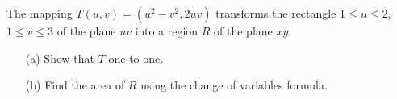 The mapping \( T(u, v) = (u^2 - v^2, 2uv) \) transforms the rectangle \( 1 \leq u \leq 2 \), \( 1 \leq v \leq 3 \) of the plane \( uv \) into a
region  \( R \) of the plane \( xy \).

\begin{enumerate}
    \item[(a)] Show that \( T \) one-to-one.
    \item[(b)] Find the area of \( R \) using the change of variables formula.
\end{enumerate}
